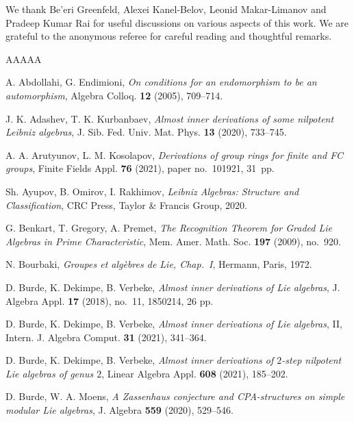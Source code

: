 \documentclass[11pt,reqno]{amsart}
\numberwithin{equation}{section}
\theoremstyle{definition}
\begin{document}
\medskip


 We thank Be'eri Greenfeld, Alexei Kanel-Belov, Leonid Makar-Limanov and Pradeep Kumar Rai for useful
discussions on various aspects of this work. We are grateful to the anonymous referee for careful reading and thoughtful remarks.

\begin{thebibliography}{AAAAA}

A. Abdollahi, G. Endimioni,
{\it On conditions for an endomorphism to be an automorphism},
Algebra Colloq. {\bf 12} (2005), 709--714.

J. K. Adashev, T. K. Kurbanbaev,
\emph{Almost inner derivations of some nilpotent Leibniz algebras},
J. Sib. Fed. Univ. Mat. Phys. {\bf 13} (2020), 733--745.

A. A. Arutyunov, L. M. Kosolapov,
\emph{Derivations of group rings for finite and FC groups},
Finite Fields Appl. {\bf 76} (2021), paper no.~101921, 31~pp.


Sh. Ayupov, B. Omirov, I. Rakhimov,
\emph{Leibniz Algebras: Structure and Classification}, CRC Press, Taylor \& Francis Group, 2020.

G. Benkart, T. Gregory, A. Premet,
\emph{The Recognition Theorem for Graded Lie Algebras in Prime Characteristic},
Mem. Amer. Math. Soc. {\bf 197} (2009), no.~920.


N. Bourbaki,
{\it Groupes et alg\`ebres de Lie, Chap.~I}, Hermann, Paris, 1972.

D. Burde, K. Dekimpe, B. Verbeke,
\emph{Almost inner derivations of Lie algebras},
J. Algebra Appl. {\bf 17} (2018), no.~11, 1850214, 26 pp.

D. Burde, K. Dekimpe, B. Verbeke,
\emph{Almost inner derivations of Lie algebras}, II,
Intern. J. Algebra Comput. {\bf 31} (2021), 341--364.

D. Burde, K. Dekimpe, B. Verbeke,
\emph{Almost inner derivations of $2$-step nilpotent Lie algebras of genus $2$},
Linear Algebra Appl. {\bf 608} (2021), 185--202.

D. Burde, W. A. Moens,
\emph{A Zassenhaus conjecture and CPA-structures on simple modular Lie algebras},
J. Algebra {\bf 559} (2020), 529--546.


\end{thebibliography}
\end{document}
